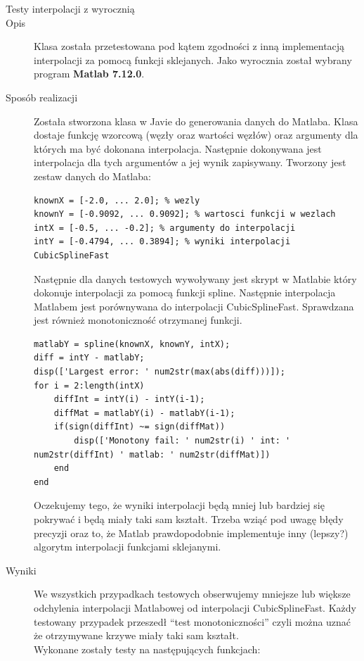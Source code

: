 \documentclass[12pt,a4paper,notitlepage]{article}
\begin{document}
\vspace*{5mm}
\begin{description}
\item [Testy interpolacji z wyrocznią]
\item [Opis] Klasa została przetestowana pod kątem zgodności z inną implementacją interpolacji za pomocą funkcji sklejanych. Jako wyrocznia został wybrany program \textbf{Matlab 7.12.0}.
\item [Sposób realizacji] Została stworzona klasa w Javie do generowania danych do Matlaba. Klasa dostaje funkcję wzorcową (węzły oraz wartości węzłów) oraz argumenty dla których ma być dokonana interpolacja. Następnie dokonywana jest interpolacja dla tych argumentów a jej wynik zapisywany. Tworzony jest zestaw danych do Matlaba:
\begin{lstlisting}
knownX = [-2.0, ... 2.0]; % wezly
knownY = [-0.9092, ... 0.9092]; % wartosci funkcji w wezlach
intX = [-0.5, ... -0.2]; % argumenty do interpolacji
intY = [-0.4794, ... 0.3894]; % wyniki interpolacji CubicSplineFast
\end{lstlisting}
Następnie dla danych testowych wywoływany jest skrypt w Matlabie który dokonuje interpolacji za pomocą funkcji spline. Następnie interpolacja Matlabem jest porównywana do interpolacji CubicSplineFast. Sprawdzana jest również monotoniczność otrzymanej funkcji.
\begin{lstlisting}
matlabY = spline(knownX, knownY, intX);
diff = intY - matlabY;
disp(['Largest error: ' num2str(max(abs(diff)))]);
for i = 2:length(intX)
    diffInt = intY(i) - intY(i-1);
    diffMat = matlabY(i) - matlabY(i-1);
    if(sign(diffInt) ~= sign(diffMat))
        disp(['Monotony fail: ' num2str(i) ' int: ' num2str(diffInt) ' matlab: ' num2str(diffMat)])
    end
end
\end{lstlisting}
Oczekujemy tego, że wyniki interpolacji będą mniej lub bardziej się pokrywać i będą miały taki sam kształt. Trzeba wziąć pod uwagę błędy precyzji oraz to, że Matlab prawdopodobnie implementuje inny (lepszy?) algorytm interpolacji funkcjami sklejanymi.
\item [Wyniki] We wszystkich przypadkach testowych obserwujemy mniejsze lub większe odchylenia interpolacji Matlabowej od interpolacji CubicSplineFast. Każdy testowany przypadek przeszedł ``test monotoniczności'' czyli można uznać że otrzymywane krzywe miały taki sam kształt.\\

Wykonane zostały testy na następujących funkcjach:


\end{description}
\end{document}
